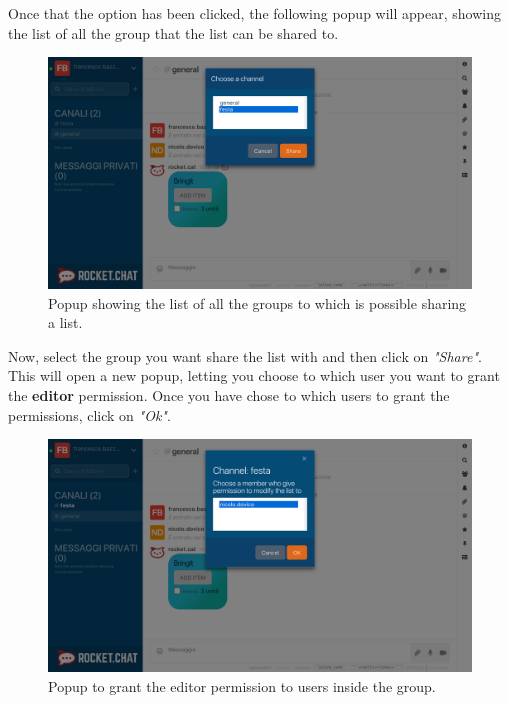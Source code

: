 Once that the option has been clicked, the following popup will appear, showing the list of all the group that the list can be shared to.

\begin{figure}[H]
  \centering 
  \includegraphics[width=\textwidth]{Sections/3-HowToUse/Images/share_channel.png}
  \caption{Popup showing the list of all the groups to which is possible sharing a list.}
\end{figure}

Now, select the group you want share the list with and then click on \textit{"Share"}. \\
This will open a new popup, letting you choose to which user you want to grant the \textbf{editor} permission. Once you have chose to which users to grant the permissions, click on \textit{"Ok"}.

\begin{figure}[H]
  \centering 
  \includegraphics[width=\textwidth]{Sections/3-HowToUse/Images/share_user.png}
  \caption{Popup to grant the editor permission to users inside the group.}
\end{figure}
